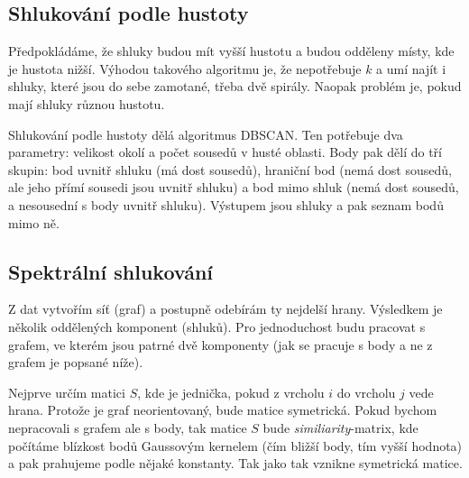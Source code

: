 \subsection{Shlukování podle hustoty}

Předpokládáme, že shluky budou mít vyšší hustotu a budou odděleny místy, kde je hustota nižší. Výhodou takového algoritmu je, že nepotřebuje $k$ a umí najít i shluky, které jsou do sebe zamotané, třeba dvě spirály. Naopak problém je, pokud mají shluky různou hustotu.

Shlukování podle hustoty dělá algoritmus DBSCAN. Ten potřebuje dva parametry: velikost okolí a počet sousedů v husté oblasti. Body pak dělí do tří skupin: bod uvnitř shluku (má dost sousedů), hraniční bod (nemá dost sousedů, ale jeho přímí sousedi jsou uvnitř shluku) a bod mimo shluk (nemá dost sousedů, a nesousední s body uvnitř shluku). Výstupem jsou shluky a pak seznam bodů mimo ně.

\subsection{Spektrální shlukování}

Z dat vytvořím síť (graf) a postupně odebírám ty nejdelší hrany. Výsledkem je několik oddělených komponent (shluků). Pro jednoduchost budu pracovat s grafem, ve kterém jsou patrné dvě komponenty (jak se pracuje s body a ne z grafem je popsané níže).

\begin{figure}[ht!]
\centering
{}
\end{figure}

Nejprve určím matici $S$, kde je jednička, pokud z vrcholu $i$ do vrcholu $j$ vede hrana. Protože je graf neorientovaný, bude matice symetrická. Pokud bychom nepracovali s grafem ale s body, tak matice $S$ bude \textit{similiarity}-matrix, kde počítáme blízkost bodů Gaussovým kernelem (čím bližší body, tím vyšší hodnota) a pak prahujeme podle nějaké konstanty. Tak jako tak vznikne symetrická matice.

